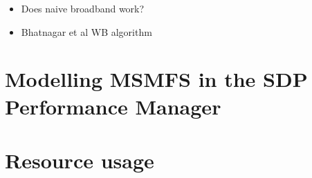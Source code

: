 \documentclass[11pt,a4paper]{article}
\begin{document}
\begin{itemize}
\item Does naive broadband work?
\item Bhatnagar et al WB algorithm	
\end{itemize}


\clearpage
\section{Modelling MSMFS in the SDP Performance Manager}
\label{sec:modelling}

\clearpage
\section{Resource usage}
\label{sec:resource}





\clearpage {}
%
\end{document}
